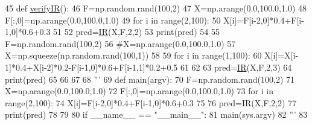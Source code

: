 \begin{DoxyCode}
45 \textcolor{keyword}{def }\hyperlink{namespaceIR_aeaee615025a0b0c13500382312ba7745}{verifyIR}():
46     F=np.random.rand(100,2)
47     X=np.arange(0.0,100.0,1.0)
48     F[:,0]=np.arange(0.0,100.0,1.0)
49     \textcolor{keywordflow}{for} i \textcolor{keywordflow}{in} range(2,100):
50         X[i]=F[i-2,0]*0.4+F[i-1,0]*0.6+0.3
51 
52     pred=\hyperlink{namespaceIR}{IR}(X,F,2,2)
53     print(pred)
54 
55     F=np.random.rand(100,2)
56     \textcolor{comment}{#X=np.arange(0.0,100.0,1.0)}
57     X=np.squeeze(np.random.rand(100,1))
58 
59     \textcolor{keywordflow}{for} i \textcolor{keywordflow}{in} range(1,100):
60         X[i]=X[i-1]*0.4+X[i-2]*0.2-F[i-1,0]*0.6+F[i-1,1]*0.2+0.5
61 
62 
63     pred=\hyperlink{namespaceIR}{IR}(X,F,2,3)
64     print(pred)
65 
66 
67 
68 \textcolor{stringliteral}{'''}
69 \textcolor{stringliteral}{def main(argv):}
70 \textcolor{stringliteral}{    F=np.random.rand(100,2)}
71 \textcolor{stringliteral}{    X=np.arange(0.0,100.0,1.0)}
72 \textcolor{stringliteral}{    F[:,0]=np.arange(0.0,100.0,1.0)}
73 \textcolor{stringliteral}{    for i in range(2,100):}
74 \textcolor{stringliteral}{        X[i]=F[i-2,0]*0.4+F[i-1,0]*0.6+0.3}
75 \textcolor{stringliteral}{}
76 \textcolor{stringliteral}{    pred=IR(X,F,2,2)}
77 \textcolor{stringliteral}{    print(pred)}
78 \textcolor{stringliteral}{}
79 \textcolor{stringliteral}{}
80 \textcolor{stringliteral}{if \_\_name\_\_ == "\_\_main\_\_":}
81 \textcolor{stringliteral}{    main(sys.argv)}
82 \textcolor{stringliteral}{'''}
83 \end{DoxyCode}
